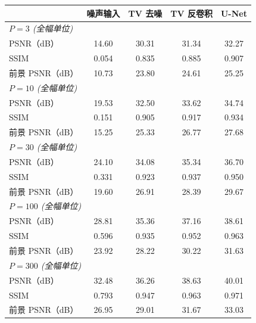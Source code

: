 \begin{tabular}{lcccc}
\toprule
 & 噪声输入 & TV 去噪 & TV 反卷积 & U-Net \\
\midrule
\multicolumn{5}{l}{\emph{$P=3$ (全幅单位)}} \\
PSNR（dB） & 14.60 & 30.31 & 31.34 & 32.27 \\
SSIM & 0.054 & 0.835 & 0.885 & 0.907 \\
前景 PSNR（dB） & 10.73 & 23.80 & 24.61 & 25.25 \\
\midrule
\multicolumn{5}{l}{\emph{$P=10$ (全幅单位)}} \\
PSNR（dB） & 19.53 & 32.50 & 33.62 & 34.74 \\
SSIM & 0.151 & 0.905 & 0.917 & 0.934 \\
前景 PSNR（dB） & 15.25 & 25.33 & 26.77 & 27.68 \\
\midrule
\multicolumn{5}{l}{\emph{$P=30$ (全幅单位)}} \\
PSNR（dB） & 24.10 & 34.08 & 35.34 & 36.70 \\
SSIM & 0.331 & 0.923 & 0.937 & 0.950 \\
前景 PSNR（dB） & 19.60 & 26.91 & 28.39 & 29.67 \\
\midrule
\multicolumn{5}{l}{\emph{$P=100$ (全幅单位)}} \\
PSNR（dB） & 28.81 & 35.36 & 37.16 & 38.61 \\
SSIM & 0.596 & 0.935 & 0.952 & 0.963 \\
前景 PSNR（dB） & 23.92 & 28.22 & 30.22 & 31.63 \\
\midrule
\multicolumn{5}{l}{\emph{$P=300$ (全幅单位)}} \\
PSNR（dB） & 32.48 & 36.26 & 38.63 & 40.01 \\
SSIM & 0.793 & 0.947 & 0.963 & 0.971 \\
前景 PSNR（dB） & 26.95 & 29.01 & 31.67 & 33.03 \\
\bottomrule
\end{tabular}
